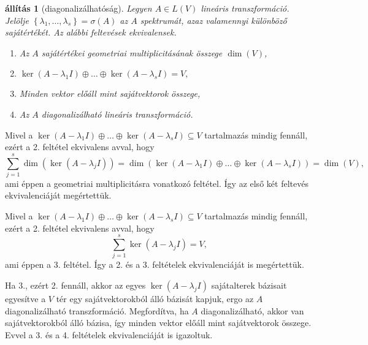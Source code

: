 \documentclass[9pt, a4paper, showtrims]{memoir}
\makeatletter
\renewenvironment{proof}[1][\proofname]
    {\par\pushQED{\qed}%
    \normalfont \topsep6\p@\@plus6\p@\relax
    \trivlist
    \item[\hskip\labelsep
        \itshape
    #1\@addpunct{:}]\ignorespaces}
    {\popQED\endtrivlist\@endpefalse}
\theoremstyle{plain}
\newtheorem{proposition}{állítás}[chapter]
\theoremstyle{remark}
\theoremstyle{definition}
\makeatother
\begin{document}
\begin{proposition}[diagonalizálhatóság]\label{pr:diagkar}
	Legyen $A\in L\left( V \right)$ lineáris transzformáció.
	Jelölje $\left\{ \lambda_1,\ldots,\lambda_s \right\}=\sigma\left( A \right)$
	az $A$ spektrumát,
	azaz valamennyi különböző sajátértékét.
	Az alábbi feltevések ekvivalensek.
	\begin{enumerate}
		\item Az $A$ sajátértékei geometriai multiplicitásának összege $\dim(V)$,
		\item
		      \begin{math}
			      \ker\left( A-\lambda_1 I \right)\oplus\dots\oplus\ker\left( A-\lambda_s I \right)=V,
		      \end{math}
		\item Minden vektor előáll mint sajátvektorok összege,
		\item Az $A$ diagonalizálható lineáris transzformáció.\qedhere
	\end{enumerate}
\end{proposition}
\begin{proof}
	Mivel a $\ker\left( A-\lambda_1 I \right)\oplus\dots\oplus\ker\left( A-\lambda_s I \right)\subseteq V$
	tartalmazás mindig fennáll,
	ezért a 2. feltétel ekvivalens avval, hogy
	\[
		\sum_{j=1}^s\dim\left( \ker\left( A-\lambda_j I \right) \right)
		=
		\dim\left(
		\ker\left( A-\lambda_1 I \right)\oplus\dots\oplus\ker\left( A-\lambda_s I \right)
		\right)
		=\dim(V),
	\]
	ami éppen a geometriai multiplicitásra vonatkozó feltétel.
	Így az első két feltevés ekvivalenciáját megértettük.


	Mivel a $\ker\left( A-\lambda_1 I \right)\oplus\dots\oplus\ker\left( A-\lambda_s I \right)\subseteq V$
	tartalmazás mindig fennáll,
	ezért a 2. feltétel ekvivalens avval, hogy
	\[
		\sum_{j=1}^s\ker\left( A-\lambda_j I \right)=V,
	\]
	ami éppen a 3. feltétel.
	Így a 2. és a 3. feltételek ekvivalenciáját is megértettük.

	Ha 3., ezért 2. fennáll, akkor az egyes $\ker\left( A-\lambda_j I \right)$ sajátalterek bázisait egyesítve a
	$V$ tér egy sajátvektorokból álló bázisát kapjuk,
	ergo az $A$ diagonalizálható transzformáció.
	Megfordítva,
	ha $A$ diagonalizálható,
	akkor van sajátvektorokból álló bázisa,
	így minden vektor előáll mint sajátvektorok összege.
	Evvel a 3. és a 4. feltételek ekvivalenciáját is igazoltuk.
\end{proof}
\end{document}
